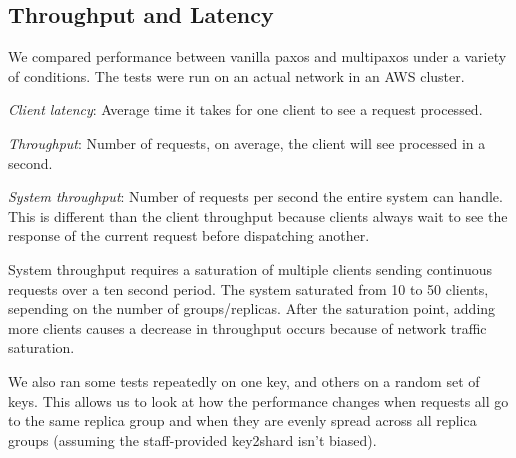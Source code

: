\documentclass[letterpaper,10pt]{article}
\begin{document}
\subsection{Throughput and Latency}

We compared performance between vanilla paxos and multipaxos under a
variety of conditions. The tests were run on an actual network in an
AWS cluster. 

\textit{Client latency}: Average time it takes for one client to see a
request processed. 

\textit{Throughput}: Number of requests, on average, the
client will see processed in a second.

\textit{System throughput}: Number of requests per second the entire
system can handle. This is different than the client throughput
because clients always wait to see the response of the current request
before dispatching another.

System throughput requires a saturation of multiple clients sending
continuous requests over a ten second period. The system saturated
from 10 to 50 clients, sepending on the number of
groups/replicas. After the saturation point, adding more clients
causes a decrease in throughput occurs because of network traffic
saturation.

We also ran some tests repeatedly on one key, and others on a random
set of keys. This allows us to look at how the performance changes
when requests all go to the same replica group and when they are
evenly spread across all replica groups (assuming the staff-provided
key2shard isn't biased).
\end{document}
